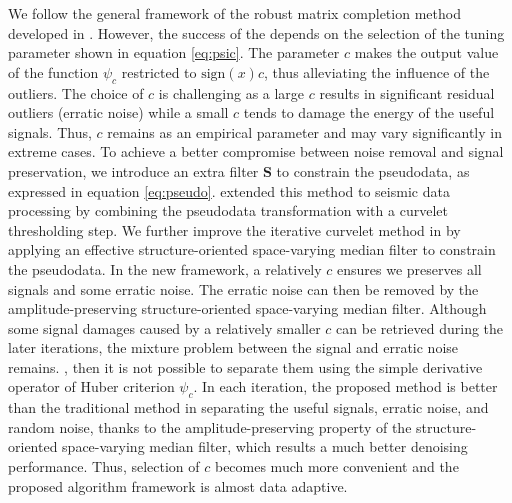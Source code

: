 We follow the general framework of the robust matrix completion method developed in \cite{wong2017matrix}. However, the success of the  depends on the selection of the tuning parameter shown in equation \ref{eq:psic}. The parameter $c$ makes the output value of the function $\psi_c$ restricted to $\text{sign}(x)c$, thus alleviating the influence of the outliers. The choice of $c$ is challenging as a large $c$ results in significant residual outliers (erratic noise) while a small $c$ tends to damage the energy of the useful signals. Thus, $c$ remains as an empirical parameter and may vary significantly in extreme cases. To achieve a better compromise between noise removal and signal preservation, we introduce an extra filter $\mathbf{S}$ to constrain the pseudodata, as expressed in equation \ref{eq:pseudo}.  \cite{zhaoqiang2018} extended this method to seismic data processing by combining the pseudodata transformation with a curvelet thresholding step. We further improve the iterative curvelet method in \cite{zhaoqiang2018} by applying an effective structure-oriented space-varying median filter to constrain the pseudodata. In the new framework, a relatively  $c$ ensures we preserves all signals and some erratic noise. The erratic noise can then be removed by the amplitude-preserving structure-oriented space-varying median filter. Although some signal damages caused by a relatively smaller $c$ can be retrieved during the later iterations, the mixture problem between the signal and erratic noise remains. , then it is not possible to separate them using the simple derivative operator of Huber criterion $\psi_c$. In each iteration, the proposed method is better than the traditional method in separating the useful signals, erratic noise, and random noise, thanks to the amplitude-preserving property of the structure-oriented space-varying median filter, which results  a much better  denoising performance.  Thus, selection of $c$ becomes much more convenient and the proposed algorithm framework is almost data adaptive.  
 
